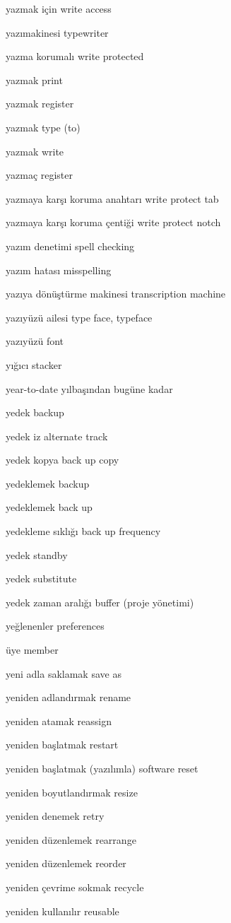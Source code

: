 \documentclass[12pt,fleqn]{article}\usepackage{../../common}
\begin{document}
yazmak için write access

yazımakinesi typewriter

yazma korumalı write protected

yazmak print

yazmak register

yazmak type (to)

yazmak write

yazmaç register

yazmaya karşı koruma anahtarı write protect tab

yazmaya karşı koruma çentiği write protect notch

yazım denetimi spell checking

yazım hatası misspelling

yazıya dönüştürme makinesi transcription machine

yazıyüzü ailesi type face, typeface

yazıyüzü font

yığıcı stacker

year-to-date yılbaşından bugüne kadar

yedek backup

yedek iz alternate track

yedek kopya back up copy

yedeklemek backup

yedeklemek back up

yedekleme sıklığı back up frequency

yedek standby

yedek substitute

yedek zaman aralığı buffer (proje yönetimi)

yeğlenenler preferences

üye member

yeni adla saklamak save as

yeniden adlandırmak rename

yeniden atamak reassign

yeniden başlatmak restart

yeniden başlatmak (yazılımla) software reset

yeniden boyutlandırmak resize

yeniden denemek retry

yeniden düzenlemek rearrange

yeniden düzenlemek reorder

yeniden çevrime sokmak recycle

yeniden kullanılır reusable
\end{document}
